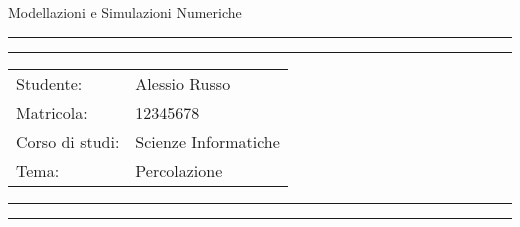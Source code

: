 \documentclass[11pt]{article}
\newcommand{\studentname}{Alessio Russo}
\newcommand{\studentnumber}{12345678}
\newcommand{\course}{Scienze Informatiche}
\newcommand{\theme}{Percolazione}
\begin{document}
\begin{center}
{\Huge{Modellazioni e Simulazioni Numeriche}} \\
\end{center}

\vspace{5mm}
\hrule
\vspace{1mm}
\hrule

\vspace{3mm}
\begin{tabular}{ll} 
Studente:                     & {\studentname}   \\ 
Matricola:           & {\studentnumber} \\ 
Corso di studi:           & {\course}  \\ 
Tema:           & {\theme}  \\ 
\end{tabular}

\vspace{3mm}
\hrule
\vspace{1mm}
\hrule


\end{document}
